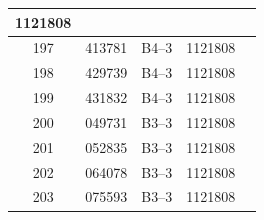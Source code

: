 \documentclass[UTF8,10pt,a4paper,fontset=fandol]{ctexart}
\newcommand{\fieldvalue}[1]{#1}
\begin{document}
\begin{tabularx}{\textwidth}{|c|c|c|c|X|}
\fieldvalue{1121808} & \\ \hline
\fieldvalue{197} &
\fieldvalue{413781} &
\fieldvalue{B4--3} &
\fieldvalue{1121808} & \\ \hline
\fieldvalue{198} &
\fieldvalue{429739} &
\fieldvalue{B4--3} &
\fieldvalue{1121808} & \\ \hline
\fieldvalue{199} &
\fieldvalue{431832} &
\fieldvalue{B4--3} &
\fieldvalue{1121808} & \\ \hline
\fieldvalue{200} &
\fieldvalue{049731} &
\fieldvalue{B3--3} &
\fieldvalue{1121808} & \\ \hline
\fieldvalue{201} &
\fieldvalue{052835} &
\fieldvalue{B3--3} &
\fieldvalue{1121808} & \\ \hline
\fieldvalue{202} &
\fieldvalue{064078} &
\fieldvalue{B3--3} &
\fieldvalue{1121808} & \\ \hline
\fieldvalue{203} &
\fieldvalue{075593} &
\fieldvalue{B3--3} &
\fieldvalue{1121808} & \\ \hline

\end{tabularx}
\end{document}
